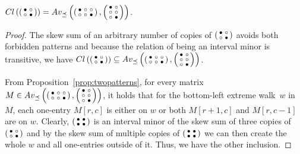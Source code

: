 \begin{prop}
$\Cl{\smm{\bullet&\circ\\\circ&\bullet}}=\Avm{\smm{\bullet&\circ&\circ\\\circ&\circ&\bullet},\smm{\bullet&\circ\\\circ&\circ\\\circ&\bullet}}$.
\end{prop}
\begin{proof}
The skew sum of an arbitrary number of copies of $\smm{\bullet&\circ\\\circ&\bullet}$ avoids both forbidden patterns and because the relation of being an interval minor is transitive, we have $\Cl{\smm{\bullet&\circ\\\circ&\bullet}}\subseteq\Avm{\smm{\bullet&\circ&\circ\\\circ&\circ&\bullet},\smm{\bullet&\circ\\\circ&\circ\\\circ&\bullet}}$.

From Proposition~\ref{prop:twopatterns}, for every matrix~$M\in\Avm{\smm{\bullet&\circ&\circ\\\circ&\circ&\bullet},\smm{\bullet&\circ\\\circ&\circ\\\circ&\bullet}}$, it holds that for the bottom-left extreme walk~$w$ in $M$, each one-entry $M[r,c]$ is either on $w$ or both $M[r+1,c]$ and $M[r,c-1]$ are on $w$. Clearly, $\smm{\bullet&\bullet\\\bullet&\bullet}$ is an interval minor of the skew sum of three copies of $\smm{\bullet&\circ\\\circ&\bullet}$ and by the skew sum of multiple copies of $\smm{\bullet&\bullet\\\bullet&\bullet}$ we can then create the whole $w$ and all one-entries outside of it. Thus, we have the other inclusion.
\end{proof}



